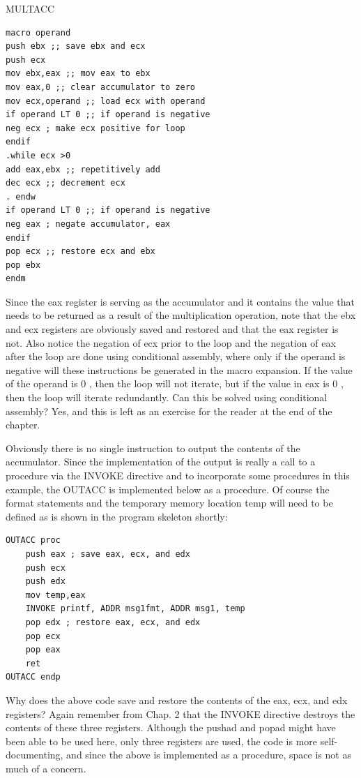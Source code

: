 \documentclass[10pt]{article}
\begin{document}
MULTACC

\begin{verbatim}
macro operand
push ebx ;; save ebx and ecx
push ecx
mov ebx,eax ;; mov eax to ebx
mov eax,0 ;; clear accumulator to zero
mov ecx,operand ;; load ecx with operand
if operand LT 0 ;; if operand is negative
neg ecx ; make ecx positive for loop
endif
.while ecx >0
add eax,ebx ;; repetitively add
dec ecx ;; decrement ecx
. endw
if operand LT 0 ;; if operand is negative
neg eax ; negate accumulator, eax
endif
pop ecx ;; restore ecx and ebx
pop ebx
endm
\end{verbatim}

Since the eax register is serving as the accumulator and it contains the value that needs to be returned as a result of the multiplication operation, note that the ebx and ecx registers are obviously saved and restored and that the eax register is not. Also notice the negation of ecx prior to the loop and the negation of eax after the loop are done using conditional assembly, where only if the operand is negative will these instructions be generated in the macro expansion. If the value of the operand is 0 , then the loop will not iterate, but if the value in eax is 0 , then the loop will iterate redundantly. Can this be solved using conditional assembly? Yes, and this is left as an exercise for the reader at the end of the chapter.

Obviously there is no single instruction to output the contents of the accumulator. Since the implementation of the output is really a call to a procedure via the INVOKE directive and to incorporate some procedures in this example, the OUTACC is implemented below as a procedure. Of course the format statements and the temporary memory location temp will need to be defined as is shown in the program skeleton shortly:

\begin{verbatim}
OUTACC proc
    push eax ; save eax, ecx, and edx
    push ecx
    push edx
    mov temp,eax
    INVOKE printf, ADDR msg1fmt, ADDR msg1, temp
    pop edx ; restore eax, ecx, and edx
    pop ecx
    pop eax
    ret
OUTACC endp
\end{verbatim}

Why does the above code save and restore the contents of the eax, ecx, and edx registers? Again remember from Chap. 2 that the INVOKE directive destroys the contents of these three registers. Although the pushad and popad might have been able to be used here, only three registers are used, the code is more self-documenting, and since the above is implemented as a procedure, space is not as much of a concern.
\end{document}
